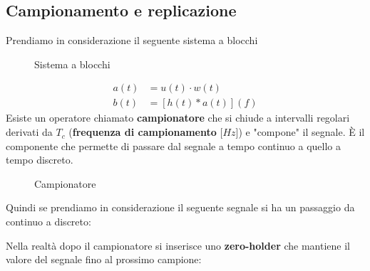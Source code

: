 \documentclass[a4paper]{article}
\begin{document}
\subsection{Campionamento e replicazione}
Prendiamo in considerazione il seguente sistema a blocchi
\begin{figure}[H]
  \centering
  \caption{Sistema a blocchi}
\end{figure}
\[
  \begin{aligned}
    a(t) &= u(t) \cdot w(t)\\
    b(t) &= \left[ h(t) \ast a(t) \right](f)
  \end{aligned}
\] 
Esiste un operatore chiamato \textbf{campionatore} che si chiude a intervalli regolari
derivati da \( T_c \) (\textbf{frequenza di campionamento} [\( Hz \)]) e "compone" il
segnale. È il componente che permette di passare dal segnale a tempo continuo a quello
a tempo discreto.
\begin{figure}[H]
  \centering
  \caption{Campionatore}
\end{figure}
\noindent
Quindi se prendiamo in considerazione il seguente segnale si ha un passaggio da continuo
a discreto:
\label{16-01-D1}

\vspace{1em}
\noindent
Nella realtà dopo il campionatore si inserisce uno \textbf{zero-holder} che mantiene il valore
del segnale fino al prossimo campione:
\label{16-01-D2}
\end{document}
